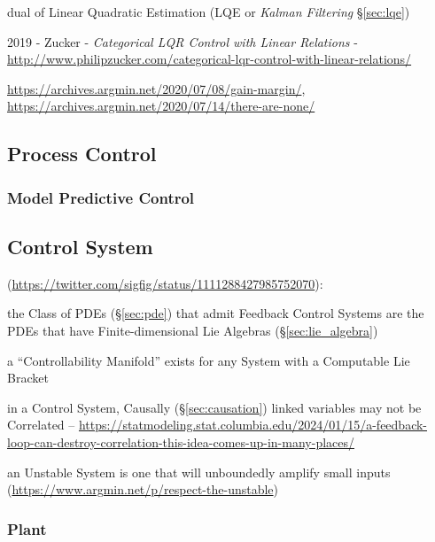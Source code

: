dual of Linear Quadratic Estimation (LQE or \emph{Kalman Filtering}
\S\ref{sec:lqe})

2019 - Zucker - \emph{Categorical LQR Control with Linear Relations} -
  \url{http://www.philipzucker.com/categorical-lqr-control-with-linear-relations/}

\url{https://archives.argmin.net/2020/07/08/gain-margin/},
\url{https://archives.argmin.net/2020/07/14/there-are-none/}



\subsection{Process Control}\label{sec:process_control}

\subsubsection{Model Predictive Control}\label{sec:model_predictive_control}



\subsection{Control System}\label{sec:control_system}

(\url{https://twitter.com/sigfig/status/1111288427985752070}):

the Class of PDEs (\S\ref{sec:pde}) that admit Feedback Control Systems are the
PDEs that have Finite-dimensional Lie Algebras (\S\ref{sec:lie_algebra})

a ``Controllability Manifold'' exists for any System with a Computable Lie
Bracket

in a Control System, Causally (\S\ref{sec:causation}) linked variables may not
be Correlated --
\url{https://statmodeling.stat.columbia.edu/2024/01/15/a-feedback-loop-can-destroy-correlation-this-idea-comes-up-in-many-places/}

an Unstable System is one that will unboundedly amplify small inputs
(\url{https://www.argmin.net/p/respect-the-unstable})



\subsubsection{Plant}\label{sec:plant}

